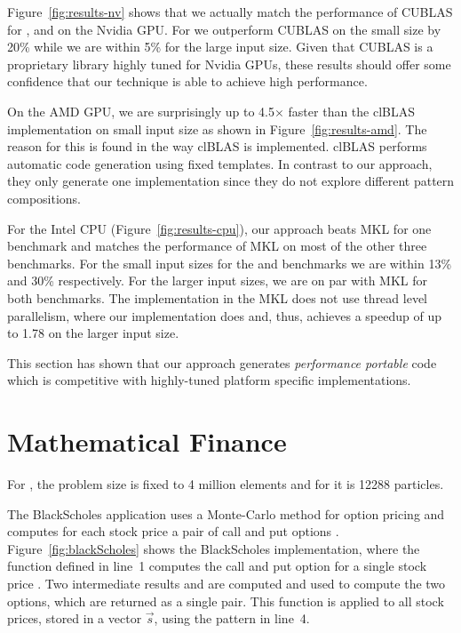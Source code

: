 Figure~\ref{fig:results-nv} shows that we actually match the performance of CUBLAS for ,  and  on the Nvidia GPU.
For  we outperform CUBLAS on the small size by 20\% while we are within 5\% for the large input size.
Given that CUBLAS is a proprietary library highly tuned for Nvidia GPUs, these results should offer some confidence that our technique is able to achieve high performance.

On the AMD GPU, we are surprisingly up to 4.5$\times$ faster than the clBLAS implementation on  small input size as shown in Figure~\ref{fig:results-amd}.
The reason for this is found in the way clBLAS is implemented.
clBLAS performs automatic code generation using fixed templates.
In contrast to our approach, they only generate one implementation since they do not explore different pattern compositions.

For the Intel CPU (Figure~\ref{fig:results-cpu}), our approach beats MKL for one benchmark and matches the performance of MKL on most of the other three benchmarks.
For the small input sizes for the  and  benchmarks we are within 13\% and 30\% respectively.
For the larger input sizes, we are on par with MKL for both benchmarks.
The  implementation in the MKL does not use thread level parallelism, where our implementation does and, thus, achieves a speedup of up to 1.78 on the larger input size.


This section has shown that our approach generates \emph{performance portable} code which is competitive with highly-tuned platform specific implementations.










\section{Mathematical Finance}

For , the problem size is fixed to 4 million elements and for  it is 12288 particles.

The BlackScholes application uses a Monte-Carlo method for option pricing and computes for each stock price  a pair of call and put options .
Figure~\ref{fig:blackScholes} shows the BlackScholes implementation, where the function defined in line~1 computes the call and put option for a single stock price .
Two intermediate results  and  are computed and used to compute the two options, which are returned as a single pair.
This  function is applied to all stock prices, stored in a vector $\vec{s}$, using the  pattern in line~4.


